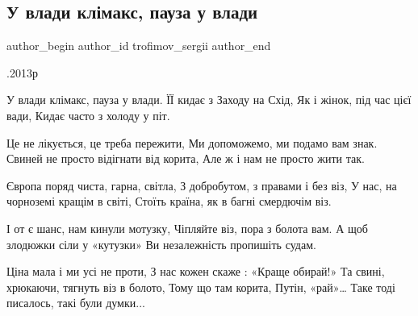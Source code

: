  
 
 
 
 
 
\subsection{У влади клімакс, пауза у влади}
\label{sec:01_12_2020.fb.trofimov_sergii.1.u_vlady_klimaks}
\ifcmt
	author_begin
   author_id trofimov_sergii
	author_end
\fi

\begin{multicols}{2}
	.2013р

У влади клімакс, пауза у влади.
ЇЇ кидає з Заходу на Схід,
Як і жінок, під час цієї вади,
Кидає часто з холоду у піт.

Це не лікується, це треба пережити,
Ми допоможемо, ми подамо вам знак.
Свиней не просто відігнати від корита,
Але ж і нам не просто жити так.

Європа поряд чиста, гарна, світла,
З добробутом, з правами і без віз,
У нас, на чорноземі кращім в світі,
Стоїть країна, як в багні смердючім віз.

І от є шанс, нам кинули мотузку,
Чіпляйте віз, пора з болота вам.
А щоб злодюжки сіли у «кутузки»
Ви незалежність пропишіть судам.

Ціна мала і ми усі не проти,
З нас кожен скаже : «Краще обирай!»
Та свині, хрюкаючи, тягнуть віз в болото,
Тому що там корита, Путін, «рай»…
Таке тоді писалось, такі були думки...
	\restorecr
\end{multicols}

